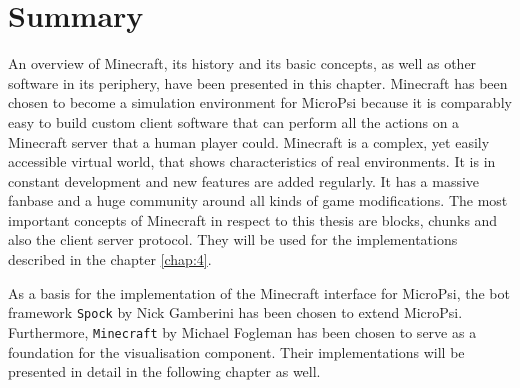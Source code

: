     \section{Summary}
An overview of Minecraft, its history and its basic concepts, as well as other software in its periphery, have been presented in this chapter. Minecraft has been chosen to become a simulation environment for MicroPsi because it is comparably easy to build custom client software that can perform all the actions on a Minecraft server that a human player could. Minecraft is a complex, yet easily accessible virtual world, that shows characteristics of real environments. It is in constant development and new features are added regularly. It has a massive fanbase and a huge community around all kinds of game modifications. The most important concepts of Minecraft in respect to this thesis are blocks, chunks and also the client server protocol. They will be used for the implementations described in the chapter \ref{chap:4}.

As a basis for the implementation of the Minecraft interface for MicroPsi, the bot framework \texttt{Spock} by Nick Gamberini has been chosen to extend MicroPsi.
Furthermore, \texttt{Minecraft} by Michael Fogleman has been chosen to serve as a foundation for the visualisation component. Their implementations will be presented in detail in the following chapter as well.